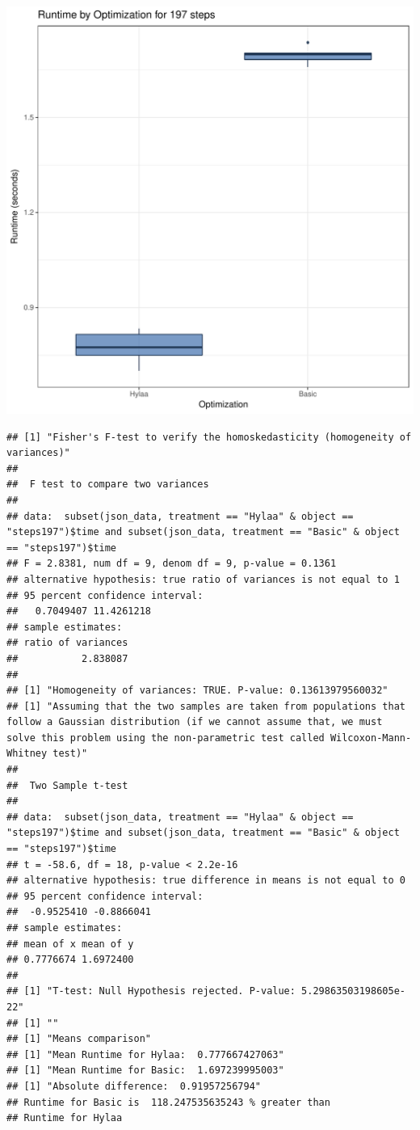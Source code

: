 \documentclass{article}\usepackage[]{graphicx}\usepackage[]{color}
\makeatletter
\def\maxwidth{ %
  \ifdim\Gin@nat@width>\linewidth
    \linewidth
  \else
    \Gin@nat@width
  \fi
}
\newenvironment{kframe}{%
 \def\at@end@of@kframe{}%
 \ifinner\ifhmode%
  \def\at@end@of@kframe{\end{minipage}}%
  \begin{minipage}{\columnwidth}%
 \fi\fi%
 \def\FrameCommand##1{\hskip\@totalleftmargin \hskip-\fboxsep
 \colorbox{shadecolor}{##1}\hskip-\fboxsep
     \hskip-\linewidth \hskip-\@totalleftmargin \hskip\columnwidth}%
 \MakeFramed {\advance\hsize-\width
   \@totalleftmargin\z@ \linewidth\hsize
   \@setminipage}}%
 {\par\unskip\endMakeFramed%
 \at@end@of@kframe}
\newenvironment{knitrout}{}{} %
\makeatother
\begin{document}
\begin{knitrout}
\color{fgcolor}
\includegraphics[width=\maxwidth]{figure/RH3_steps197-1} 
\begin{kframe}\begin{verbatim}
## [1] "Fisher's F-test to verify the homoskedasticity (homogeneity of variances)"
## 
## 	F test to compare two variances
## 
## data:  subset(json_data, treatment == "Hylaa" & object == "steps197")$time and subset(json_data, treatment == "Basic" & object == "steps197")$time
## F = 2.8381, num df = 9, denom df = 9, p-value = 0.1361
## alternative hypothesis: true ratio of variances is not equal to 1
## 95 percent confidence interval:
##   0.7049407 11.4261218
## sample estimates:
## ratio of variances 
##           2.838087 
## 
## [1] "Homogeneity of variances: TRUE. P-value: 0.13613979560032"
## [1] "Assuming that the two samples are taken from populations that follow a Gaussian distribution (if we cannot assume that, we must solve this problem using the non-parametric test called Wilcoxon-Mann-Whitney test)"
## 
## 	Two Sample t-test
## 
## data:  subset(json_data, treatment == "Hylaa" & object == "steps197")$time and subset(json_data, treatment == "Basic" & object == "steps197")$time
## t = -58.6, df = 18, p-value < 2.2e-16
## alternative hypothesis: true difference in means is not equal to 0
## 95 percent confidence interval:
##  -0.9525410 -0.8866041
## sample estimates:
## mean of x mean of y 
## 0.7776674 1.6972400 
## 
## [1] "T-test: Null Hypothesis rejected. P-value: 5.29863503198605e-22"
## [1] ""
## [1] "Means comparison"
## [1] "Mean Runtime for Hylaa:  0.777667427063"
## [1] "Mean Runtime for Basic:  1.697239995003"
## [1] "Absolute difference:  0.91957256794"
## Runtime for Basic is  118.247535635243 % greater than 
## Runtime for Hylaa
\end{verbatim}
\end{kframe}
\end{knitrout}
\end{document}
